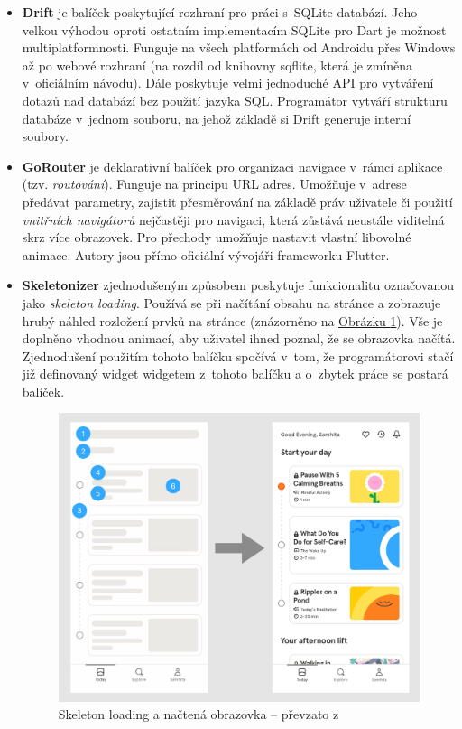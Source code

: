 \documentclass[
  biblatex,
  figures=true,
  tables=false,
  glossaries,
  index
]{kidiplom}
\begin{document}
\begin{itemize}
  \item \textbf{Drift} \cite{drift} je balíček poskytující rozhraní pro práci s~SQLite databází. Jeho velkou výhodou oproti ostatním implementacím SQLite pro Dart je možnost multiplatformnosti. Funguje na všech platformách od Androidu přes Windows až po webové rozhraní (na rozdíl od knihovny sqflite, která je zmíněna v~oficiálním návodu). Dále poskytuje velmi jednoduché API pro vytváření dotazů nad databází bez použití jazyka SQL. Programátor vytváří strukturu databáze v~jednom souboru, na jehož základě si Drift generuje interní soubory.
  \item \textbf{GoRouter} \cite{gorouter} je deklarativní balíček pro organizaci navigace v~rámci aplikace (tzv. \textit{routování}). Funguje na principu URL adres. Umožňuje v~adrese předávat parametry, zajistit přesměrování na základě práv uživatele či použití \textit{vnitřních navigátorů} nejčastěji pro navigaci, která zůstává neustále viditelná skrz více obrazovek. Pro přechody umožňuje nastavit vlastní libovolné animace. Autory jsou přímo oficiální vývojáři frameworku Flutter.
  \item \textbf{Skeletonizer} \cite{skeletonizer} zjednodušeným způsobem poskytuje funkcionalitu označovanou jako \textit{skeleton loading}. Používá se při načítání obsahu na stránce a zobrazuje hrubý náhled rozložení prvků na stránce (znázorněno  na \hyperref[fig:skeleton]{Obrázku \ref{fig:skeleton}}). Vše je doplněno vhodnou animací, aby uživatel ihned poznal, že se obrazovka načítá. Zjednodušení použitím tohoto balíčku spočívá v~tom, že programátorovi stačí již definovaný widget  widgetem  z~tohoto balíčku a o~zbytek práce se postará balíček.
  
  \begin{figure}
  	\centering
  	\includegraphics[scale=0.1]{images/skeletonizer.png}
  	\caption{Skeleton loading a načtená obrazovka -- převzato z~\cite{skeleton}}
    \label{fig:skeleton}
  \end{figure}
  

\end{itemize}
\end{document}
